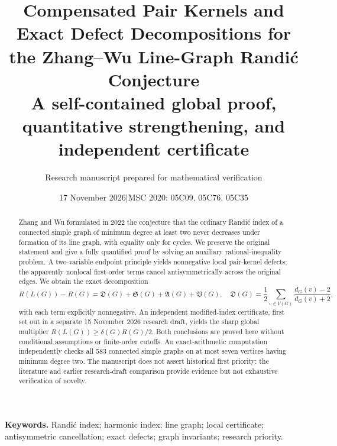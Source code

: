 \documentclass[11pt,a4paper]{article}
\title{\textbf{Compensated Pair Kernels and Exact Defect Decompositions for the Zhang--Wu Line-Graph Randi\'c Conjecture}\\[6pt]
\large A self-contained global proof, quantitative strengthening, and independent certificate}
\author{Research manuscript prepared for mathematical verification}
\date{17 November 2026\quad $\vert$\quad MSC 2020: 05C09, 05C76, 05C35}
\theoremstyle{remark}
\newcommand{\Def}{\mathfrak D}
\newcommand{\Sl}{\mathfrak S}
\newcommand{\Ag}{\mathfrak A}
\newcommand{\Var}{\mathfrak V}
\begin{document}
\maketitle
\begin{abstract}
Zhang and Wu formulated in 2022 the conjecture that the ordinary Randi\'c index of a connected simple graph of minimum degree at least two never decreases under formation of its line graph, with equality only for cycles. We preserve the original statement and give a fully quantified proof by solving an auxiliary rational-inequality problem. A two-variable endpoint principle yields nonnegative local pair-kernel defects; the apparently nonlocal first-order terms cancel antisymmetrically across the original edges. We obtain the exact decomposition
\[
 R(L(G))-R(G)=\Def(G)+\Sl(G)+\Ag(G)+\Var(G),
 \quad \Def(G)=\frac12\sum_{v\in V(G)}\frac{d_G(v)-2}{d_G(v)+2},
\]
with each term explicitly nonnegative. An independent modified-index certificate, first set out in a separate 15 November 2026 research draft, yields the sharp global multiplier $R(L(G))\ge \delta(G)R(G)/2$. Both conclusions are proved here without conditional assumptions or finite-order cutoffs. An exact-arithmetic computation independently checks all 583 connected simple graphs on at most seven vertices having minimum degree two. The manuscript does not assert historical first priority: the literature and earlier research-draft comparison provide evidence but not exhaustive verification of novelty.
\end{abstract}
\noindent\textbf{Keywords.} Randi\'c index; harmonic index; line graph; local certificate; antisymmetric cancellation; exact defects; graph invariants; research priority.
\end{document}
